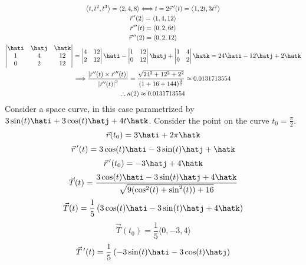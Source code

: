 \begin{gather*}
    \left\langle t,t^2 ,t^3 \right\rangle =\langle 2,4,8 \rangle \Longleftrightarrow t=2
    \vec{r}\,^{\prime} (t)=\left\langle 1,2t,3t^{2}  \right\rangle \\
    \vec{r}\,^{\prime} (2)=\langle 1,4,12 \rangle \\
    \vec{r}\,^{\prime\prime} (t)=\left\langle 0,2,6t \right\rangle \\
    \vec{r}\,^{\prime\prime} (2)=\langle 0,2,12 \rangle \\
    \begin{vmatrix}
        \hati &\hatj  &\hatk   \\
        1 &4  &12   \\
         0&2  &12   \\
    \end{vmatrix}=\begin{vmatrix}
        4 &12   \\
         2&12   \\
    \end{vmatrix}\hati-\begin{vmatrix}
        1 &12   \\
         0&12   \\
    \end{vmatrix}\hatj +\begin{vmatrix}
        1 &4   \\
         0&2   \\
    \end{vmatrix}\hatk=24\hati-12\hatj+2\hatk\\
    \Longrightarrow \frac{\left\vert \vec{r}\,^{\prime} (t)\times \vec{r}\,^{\prime\prime} (t) \right\vert }{\left\vert \vec{r}\,^{\prime} (t) \right\vert^3 }=\frac{\sqrt{24^2 +12^2 +2^2} }{(1+16+144)^{\frac{3}{2}}}\approx 0.0131713554\\
    \therefore \kappa (2)\approx 0.0131713554
\end{gather*}
Consider a space curve, in this case parametrized by \(3\sin (t)\hati+3\cos (t)\hatj+4t\hatk\). Consider the point on the curve \(t_0 =\frac{\pi}{2}\). 
\[
    \vec{r}(t_0)=3\hati+2\pi \hatk
\]
\[
    \vec{r}\,^{\prime} (t)=3\cos (t)\hati -3\sin (t)\hatj +\hatk
\]
\[
    \vec{r}\,^{\prime} (t_0)=-3\hatj+4\hatk
\]
\[
    \vec{T}(t)=\frac{3\cos (t)\hati-3\sin (t)\hatj+4\hatk}{\sqrt{9(\cos ^2(t)+\sin ^2(t))+16} }
\]
\[
    \vec{T}(t)=\frac{1}{5}\left( 3\cos (t)\hati-3\sin (t)\hatj+4\hatk \right) 
\]
\[
    \vec{T}(t_0)=\frac{1}{5}\langle 0,-3,4 \rangle 
\]
\[
    \vec{T}\,^{\prime} (t)=\frac{1}{5}\left( -3\sin (t)\hati-3\cos (t)\hatj \right) 
\]
